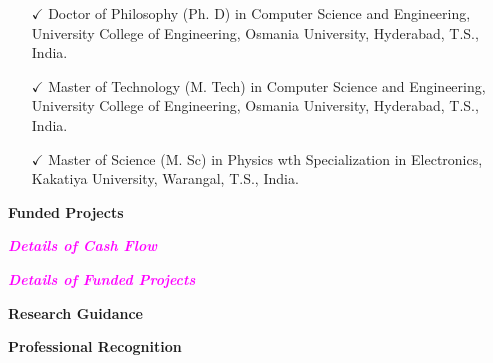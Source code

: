 \documentclass [a4paper,12pt]{article}
\begin{document}
\vspace{-0.3cm}
\begin{itemize}

\item[$\checkmark$] Doctor of Philosophy (Ph. D) in Computer Science and Engineering, University College of Engineering, Osmania University, Hyderabad, T.S., India.
\item[$\checkmark$] Master of Technology (M. Tech) in Computer Science and Engineering, University College of Engineering, Osmania University, Hyderabad, T.S., India.
\item[$\checkmark$] Master of Science (M. Sc) in Physics wth Specialization in Electronics, Kakatiya University, Warangal, T.S., India. \\
\end{itemize}

\begin{flushleft}
\textbf{\textcolor[rgb]{0.00,0.00,1.00}{Funded Projects}}
\end{flushleft}

	\begin{flushleft}
	{\em \textbf{\textcolor{magenta}{Details of Cash Flow}}}
\end{flushleft}



	\begin{flushleft}
	{\em \textbf{\textcolor{magenta}{Details of Funded Projects}}}
\end{flushleft}



%


		
%		

\begin{flushleft}
\textbf{\textcolor[rgb]{0.00,0.00,1.00}{Research Guidance}}
\end{flushleft}




\begin{flushleft}
\textbf{\textcolor[rgb]{0.00,0.00,1.00}{Professional Recognition}}
\end{flushleft}
\end{document}
